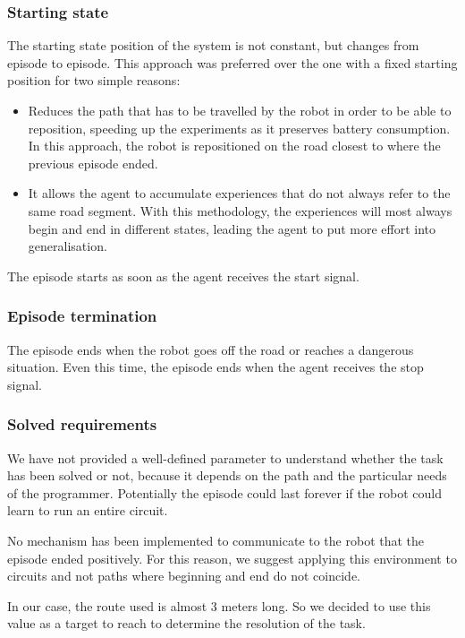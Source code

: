 \subsubsection{Starting state}

The starting state position of the system is not constant, but changes from episode to episode.
This approach was preferred over the one with a fixed starting position for two simple reasons:
\begin{itemize}
	\item Reduces the path that has to be travelled by the robot in order to be able to reposition, speeding up the experiments as it preserves battery consumption.
	      In this approach, the robot is repositioned on the road closest to where the previous episode ended.
	\item It allows the agent to accumulate experiences that do not always refer to the same road segment.
	      With this methodology, the experiences will most always begin and end in different states, leading the agent to put more effort into generalisation.
\end{itemize}

The episode starts as soon as the agent receives the start signal.

\subsubsection{Episode termination}

The episode ends when the robot goes off the road or reaches a dangerous situation.
Even this time, the episode ends when the agent receives the stop signal.

\subsubsection{Solved requirements}

We have not provided a well-defined parameter to understand whether the task has been solved or not, because it depends on the path and the particular needs of the programmer.
Potentially the episode could last forever if the robot could learn to run an entire circuit.

No mechanism has been implemented to communicate to the robot that the episode ended positively.
For this reason, we suggest applying this environment to circuits and not paths where beginning and end do not coincide.

In our case, the route used is almost 3 meters long.
So we decided to use this value as a target to reach to determine the resolution of the task.

